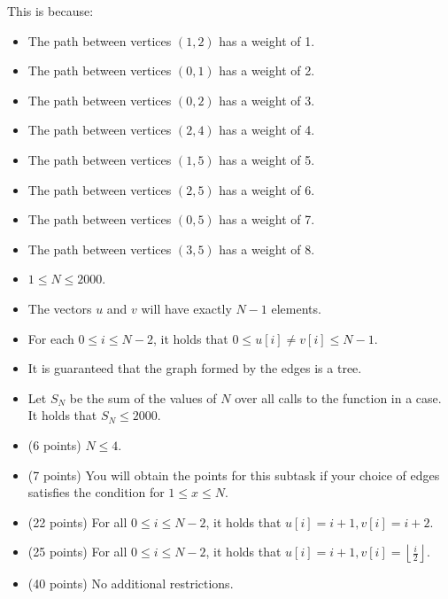 \documentclass[12pt]{scrartcl}
\begin{document}
\begin{itemize}
\begin{center}
            \end{center}
            This is because:
            \begin{itemize}
                \item The path between vertices $(1, 2)$ has a weight of 1.
                \item The path between vertices $(0, 1)$ has a weight of 2.
                \item The path between vertices $(0, 2)$ has a weight of 3.
                \item The path between vertices $(2, 4)$ has a weight of 4.
                \item The path between vertices $(1, 5)$ has a weight of 5.
                \item The path between vertices $(2, 5)$ has a weight of 6.
                \item The path between vertices $(0, 5)$ has a weight of 7.
                \item The path between vertices $(3, 5)$ has a weight of 8.
            \end{itemize}
        \end{itemize}

        \begin{itemize}
            \item $1 \le N \le 2000$.
            \item The vectors $u$ and $v$ will have exactly $N - 1$ elements.
            \item For each $0 \le i \le N - 2$, it holds that $0 \le u[i] \neq v[i] \le N - 1$. 
            \item It is guaranteed that the graph formed by the edges is a tree.
            \item Let $S_N$ be the sum of the values of $N$ over all calls to the function in a case. It holds that $S_N \le 2000$.
        \end{itemize}
    

    \begin{itemize}
        \item (6 points) $N \le 4$.
        \item (7 points) You will obtain the points for this subtask if your choice of edges satisfies the condition for $1 \le x \le N$.
        \item (22 points) For all $0 \le i \le N - 2$, it holds that $u[i] = i + 1, v[i] = i + 2$.
        \item (25 points) For all $0 \le i \le N - 2$, it holds that $u[i] = i + 1, v[i] = \left\lfloor\frac{i}{2} \right\rfloor$.
        \item (40 points) No additional restrictions.
    \end{itemize}
\end{document}
